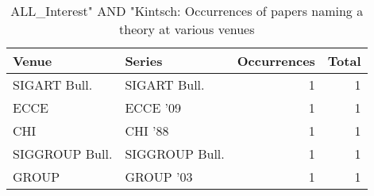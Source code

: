 \begin{table*}[t]
\begin{tabular}{llrr}
Venue & Series & Occurrences & Total\\\hline
\multirow{1}{*}{SIGART Bull.} & SIGART Bull. & 1 & \multirow{1}{*}{1}\\
\multirow{1}{*}{ECCE } & ECCE '09 & 1 & \multirow{1}{*}{1}\\
\multirow{1}{*}{CHI } & CHI '88 & 1 & \multirow{1}{*}{1}\\
\multirow{1}{*}{SIGGROUP Bull.} & SIGGROUP Bull. & 1 & \multirow{1}{*}{1}\\
\multirow{1}{*}{GROUP } & GROUP '03 & 1 & \multirow{1}{*}{1}\\
\end{tabular}
\caption{ALL\_Interest" AND "Kintsch: Occurrences of papers naming a theory at various venues}
\end{table*}